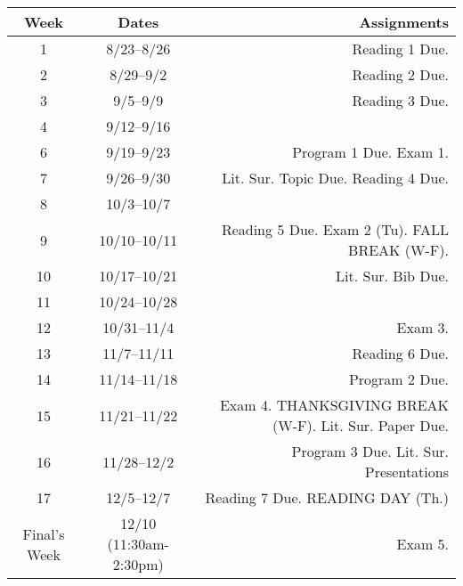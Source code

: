 \documentclass[]{tufte-handout}
\begin{document}
\begin{center}
\begin{tabular}{ccr}
\toprule
Week & Dates & Assignments \\
\toprule
1 & 8/23--8/26 & Reading 1 Due. \\
2 & 8/29--9/2 &  Reading 2 Due. \\
3 & 9/5--9/9 &   Reading 3 Due. \\
4 & 9/12--9/16 &  \\
6 & 9/19--9/23 & Program 1 Due. Exam 1.\\
7 & 9/26--9/30  & Lit. Sur. Topic Due. Reading 4 Due. \\
8 & 10/3--10/7 &   \\
9 & 10/10--10/11 &  Reading 5 Due. Exam 2 (Tu). FALL BREAK (W-F). \\
10 & 10/17--10/21 &  Lit. Sur. Bib Due. \\
11 & 10/24--10/28 &  \\
12 & 10/31--11/4 &  Exam 3.\\
13 & 11/7--11/11 &  Reading 6 Due.\\
14 & 11/14--11/18 & Program 2 Due. \\
15 & 11/21--11/22 & Exam 4. THANKSGIVING BREAK (W-F).  Lit. Sur. Paper Due. \\
16 & 11/28--12/2 &  Program 3 Due. Lit. Sur. Presentations\\
17 & 12/5--12/7 & Reading 7 Due.  READING DAY (Th.) \\
\midrule
Final's Week & 12/10 (11:30am-2:30pm) & Exam 5. \\
\bottomrule
\end{tabular}
\end{center}
\end{document}
